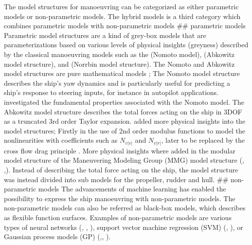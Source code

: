 The model structures for manoeuvring can be categorized as either parametric models or non-parametric models. The hybrid models is a third category which combines parametric models with non-parametric models  
## parametric models
Parametric model structures are a kind of grey-box models that are parameterizations based on various levels of physical insights (greyness) described by the classical manoeuvring models such as the \cite{nomotoSteeringQualitiesShips1957} (Nomoto model), \cite{abkowitzShipHydrodynamicsSteering1964} (Abkowitz model structure), and \cite{norrbinTheoryObservationsUse1971} (Norrbin model structure). The Nomoto and Abkowitz model structures are pure mathematical models ; The Nomoto model structure describes the ship's yaw dynamics and is particularly useful for predicting a ship's response to steering inputs, for instance in autopilot applications. \cite{tzengFUNDAMENTALPROPERTIESLINEAR1999} investigated the fundamental properties associated with the Nomoto model. The Abkowitz model structure describes the total forces acting on the ship in 3DOF as a truncated 3rd order Taylor expansion. \cite{norrbinTheoryObservationsUse1971} added more physical insights into the model structures; Firstly in the use of 2nd order modulus functions  to model the nonlinearities with coefficients such as $N_{v|v|}$ and $N_{v|r|}$, later to be replaced by the cross flow drag principle \cite{fossenHandbookMarineCraft2011}. More physical insights where added in the modular model structure of the Maneuvering Modeling Group (MMG) model structure (\cite{ogawaMathematicalModelManoeuvring1978}, \cite{inouePracticalCalculationMethod1981},\cite{yasukawaIntroductionMMGStandard2015}). Instead of describing the total force acting on the ship, the model structure was instead divided into sub models for the propeller, rudder and hull.
## non-parametric models
The advancements of machine learning has enabled the possibility to express the ship manoeuvring with non-parametric models. The non-parametric models can also be referred as black-box models, which \cite{ljungPerspectivesSystemIdentification2010} describes as flexible function surfaces.
Examples of non-parametric models are various types of neural networks (\cite{rajeshSystemIdentificationNonlinear2008}, \cite{heBlackBoxModelingShip2020}, \cite{heNonparametricModelingShip2022}), support vector machine regression (SVM) (\cite{chenOnlineModelingPrediction2023a}, \cite{zihaowangKernelbasedSupportVector2020}), or Gaussian process models (GP) (\cite{zhangLocallyWeightedNonParametric2021},\cite{xueIdentificationPredictionShip2021}, \cite{xueOnlineIdentificationShip2022}).  

